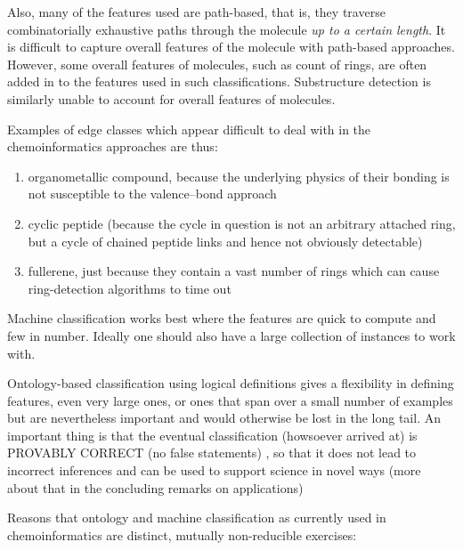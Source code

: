 \documentclass[10pt]{bmc_article}
\newenvironment{bmcformat}{\baselineskip20pt\sloppy\setboolean{publ}{false}}{\baselineskip20pt\sloppy}
\begin{document}
\begin{bmcformat}
Also, many of the features used are path-based, that is, they traverse combinatorially exhaustive paths through the molecule \textit{up to a certain length}.  It is difficult to capture overall features of the molecule with path-based approaches.  However, some overall features of molecules, such as count of rings, are often added in to the features used in such classifications. Substructure detection is similarly unable to account for overall features of molecules.  %

Examples of edge classes which appear difficult to deal with in the chemoinformatics approaches are thus:
\begin{enumerate}
  \item organometallic compound, because the underlying physics of their bonding is not susceptible to the valence--bond approach
	\item cyclic peptide (because the cycle in question is not an arbitrary attached ring, but a cycle of chained peptide links and hence not obviously detectable)
	\item fullerene, just because they contain a vast number of rings which can cause ring-detection algorithms to time out
\end{enumerate}


Machine classification works best where the features are quick to compute and few in number. Ideally one should also have a large collection of instances to work with.  

Ontology-based classification using logical definitions gives a flexibility in defining features, even very large ones, or ones that span over a small number of examples but are nevertheless important and would otherwise be lost in the long tail.  An important thing is that the eventual classification (howsoever arrived at) is PROVABLY CORRECT (no false statements) %
, so that it does not lead to incorrect inferences and can be used to support science in novel ways (more about that in the concluding remarks on applications)


Reasons that ontology and machine classification as currently used in chemoinformatics are distinct, mutually non-reducible exercises:  %


\end{bmcformat}
\end{document}
